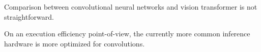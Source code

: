 \begin{description}
        \begin{remark}
            Comparison between convolutional neural networks and vision transformer is not straightforward.
        \end{remark}

        \begin{remark}
            On an execution efficiency point-of-view, the currently more common inference hardware is more optimized for convolutions.
        \end{remark}
\end{description}